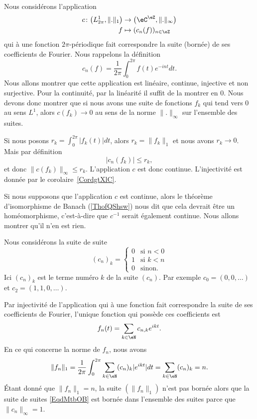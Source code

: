 Nous considérons l'application
\begin{equation}
	\begin{aligned}
		c\colon \big( L^1_{2\pi},\| . \|_1 \big) & \to \big( \eC^{\eZ},\| .\|_{\infty} \big) \\
		f                                        & \mapsto (c_n(f))_{n\in \eZ}
	\end{aligned}
\end{equation}
qui à une fonction \( 2\pi\)-périodique fait correspondre la suite (bornée) de ses coefficients de Fourier. Nous rappelons la définition
\begin{equation}
	c_n(f)=\frac{1}{ 2\pi }\int_0^{2\pi}f(t) e^{-int} dt.
\end{equation}
Nous allons montrer que cette application est linéaire, continue, injective et non surjective. Pour la continuité, par la linéarité il suffit de la montrer en \( 0\). Nous devons donc montrer que si nous avons une suite de fonctions \( f_k\) qui tend vers \( 0\) au sens \( L^1\), alors \( c(f_k)\to 0\) au sens de la norme \( \| . \|_{\infty}\) sur l'ensemble des suites.

Si nous posons \( r_k=\int_0^{2\pi}| f_k(t) |dt\), alors \( r_k=\| f_k \|_1\) et nous avons \( r_k\to 0\). Mais par définition
\begin{equation}
	| c_n(f_k) |\leq r_k,
\end{equation}
et donc \( \| c(f_k) \|_{\infty}\leq r_k\). L'application \( c\) est donc continue. L'injectivité est donnée par le corolaire~\ref{CordgtXlC}.

Si nous supposons que l'application \( c\) est continue, alors le théorème d'isomorphisme de Banach (\ref{ThofQShsw}) nous dit que cela devrait être un homéomorphisme, c'est-à-dire que \( c^{-1}\) serait également continue. Nous allons montrer qu'il n'en est rien.

Nous considérons la suite de suite
\begin{equation}    \label{EqdMtbOB}
	(c_n)_k=\begin{cases}
		0 & \text{si } n<0 \\
		1 & \text{si } k<n \\
		0 & \text{sinon}.
	\end{cases}
\end{equation}
Ici \( (c_n)_k\) est le terme numéro \( k\) de la suite \( (c_n)\). Par exemple \( c_0=(0,0,\ldots )\) et \( c_2=(1,1,0,\ldots)\).

Par injectivité de l'application qui à une fonction fait correspondre la suite de ses coefficients de Fourier, l'unique fonction qui possède ces coefficients est
\begin{equation}
	f_n(t)=\sum_{k\in \eN}c_{n,k} e^{ikt}.
\end{equation}
En ce qui concerne la norme de \( f_n\), nous avons
\begin{equation}
	\| f_n \|_1=\frac{1}{ 2\pi }\int_0^{2\pi}\sum_{k\in \eN}(c_n)_k|  e^{ikt} |dt=\sum_{k\in \eN}(c_n)_k=n.
\end{equation}
Étant donné que \( \| f_n \|_1=n\), la suite \( (\| f_n \|_1)\) n'est pas bornée alors que la suite de suites \eqref{EqdMtbOB} est bornée dans l'ensemble des suites parce que \( \| c_n \|_{\infty}=1\).

